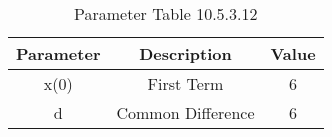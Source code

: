 
\begin{table}[ht]
  \centering
  \begin{tabular}{|c||c||c|}
    \hline
    Parameter & Description & Value \\
    \hline
     x(0) & First Term & 6\\
     \hline
     d & Common Difference & 6\\
    \hline
  \end{tabular}
  \vspace{2mm}
  \caption{Parameter Table 10.5.3.12}
\end{table}
